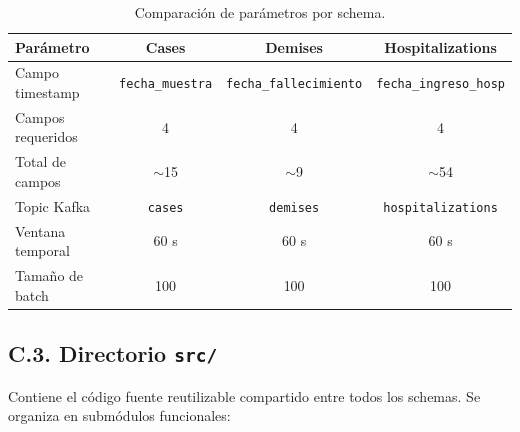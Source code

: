 \documentclass[12pt,a4paper]{article}
\begin{document}
\begin{table}[h!]
    \centering
    \begin{tabular}{|l|c|c|c|}
        \hline
        \textbf{Parámetro} & \textbf{Cases}          & \textbf{Demises}              & \textbf{Hospitalizations}     \\ \hline
        Campo timestamp    & \texttt{fecha\_muestra} & \texttt{fecha\_fallecimiento} & \texttt{fecha\_ingreso\_hosp} \\ \hline
        Campos requeridos  & 4                       & 4                             & 4                             \\ \hline
        Total de campos    & $\sim$15                & $\sim$9                       & $\sim$54                      \\ \hline
        Topic Kafka        & \texttt{cases}          & \texttt{demises}              & \texttt{hospitalizations}     \\ \hline
        Ventana temporal   & 60 s                    & 60 s                          & 60 s                          \\ \hline
        Tamaño de batch    & 100                     & 100                           & 100                           \\ \hline
    \end{tabular}
    \caption{Comparación de parámetros por schema.}
\end{table}

\subsection*{C.3. Directorio \texttt{src/}}

Contiene el código fuente reutilizable compartido entre todos los schemas. Se organiza en submódulos funcionales:
\end{document}
